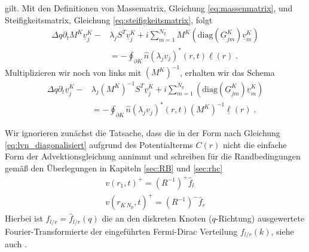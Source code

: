 gilt. Mit den Definitionen von Massematrix, Gleichung \eqref{eq:massenmatrix}, und Steifigkeitsmatrix, Gleichung \eqref{eq:steifigkeitsmatrix}, folgt
\begin{align*}
  \Delta q \partial_t M^K \underline{v}_j^K - &\lambda_j S^T\underline{v}_j^K + i\sum_{m=1}^{N_q} M^K \left(\text{diag}(\underline{G}_{jm}^K) \underline{v}_m^K\right) \\
  &= - \oint_{\partial K}  \hat{n} (\lambda_j v_j)^*(r,t)\underline{\ell}(r) \; .
\end{align*}
Multiplizieren wir noch von links mit $(M^K)^{-1}$, erhalten wir das Schema
\begin{align}
  \Delta q \partial_t \underline{v}_j^K - &\lambda_j (M^K)^{-1}S^T\underline{v}_j^K + i\sum_{m=1}^{N_q} \left(\text{diag}(\underline{G}_{jm}^K) \underline{v}_m^K\right) \\
  &= - \oint_{\partial K}  \hat{n} (\lambda_j v_j)^*(r,t) (M^K)^{-1}\underline{\ell}(r) \; .
\end{align}


Wir ignorieren zunächst die Tatsache, dass die \lvn in der Form nach Gleichung \eqref{eq:lvn_diagonalisiert} aufgrund des Potentialterms $C(r)$ nicht die einfache Form der Advektionsgleichung annimmt und schreiben für die Randbedingungen gemäß den Überlegungen in Kapiteln \ref{sec:RB} und \ref{sec:rhc}
\begin{align}
  v(r_1, t)^+ = (R^{-1})^+ \hat{f}_l  \\
  v(r_{K\,N_p},t)^+ = (R^{-1})^- \hat{f}_r
\end{align}
Hierbei ist $\hat{f}_{l/r} = \hat{f}_{l/r}(q)$ die an den diskreten  Knoten ($q$-Richtung) ausgewertete Fourier-Transformierte der eingeführten Fermi-Dirac Verteilung $f_{l/r}(k)$, siehe auch \cite{lukas1}.
